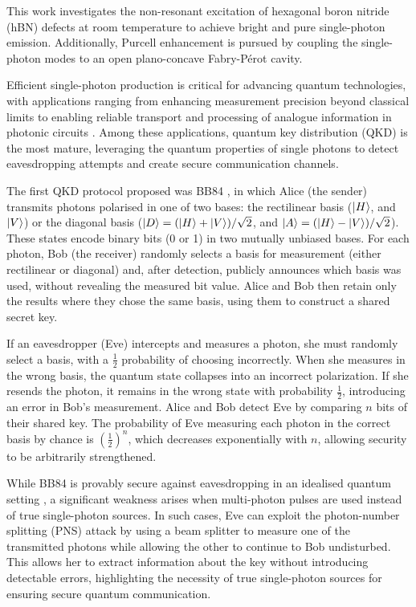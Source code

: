 This work investigates the non-resonant excitation of hexagonal boron nitride (hBN) defects at room temperature to achieve bright and pure single-photon emission. Additionally, Purcell enhancement is pursued by coupling the single-photon modes to an open plano-concave Fabry-Pérot cavity.

Efficient single-photon production is critical for advancing quantum technologies, with applications ranging from enhancing measurement precision beyond classical limits \cite{Nagata2007, Vitelli2010} to enabling reliable transport and processing of analogue information in photonic circuits \cite{Bogaerts2020}. Among these applications, quantum key distribution (QKD) is the most mature, leveraging the quantum properties of single photons to detect eavesdropping attempts and create secure communication channels. 

The first QKD protocol proposed was BB84 \cite{Bennett2014}, in which Alice (the sender) transmits photons polarised in one of two bases: the rectilinear basis ($\ket{H}$, and $\ket{V}$) or the diagonal basis ($\ket{D}=(\ket{H}+\ket{V})/\sqrt{2}$, and $\ket{A}=(\ket{H}-\ket{V})/\sqrt{2}$). These states encode binary bits (0 or 1) in two mutually unbiased bases. For each photon, Bob (the receiver) randomly selects a basis for measurement (either rectilinear or diagonal) and, after detection, publicly announces which basis was used, without revealing the measured bit value. Alice and Bob then retain only the results where they chose the same basis, using them to construct a shared secret key.

If an eavesdropper (Eve) intercepts and measures a photon, she must randomly select a basis, with a $ \frac{1}{2} $ probability of choosing incorrectly. When she measures in the wrong basis, the quantum state collapses into an incorrect polarization. If she resends the photon, it remains in the wrong state with probability $ \frac{1}{2} $, introducing an error in Bob’s measurement. Alice and Bob detect Eve by comparing $ n $ bits of their shared key. The probability of Eve measuring each photon in the correct basis by chance is $\left(\frac{1}{2}\right)^n$, which decreases exponentially with $n$, allowing security to be arbitrarily strengthened.

While BB84 is provably secure against eavesdropping in an idealised quantum setting \cite{Shor2000}, a significant weakness arises when multi-photon pulses are used instead of true single-photon sources. In such cases, Eve can exploit the photon-number splitting (PNS) attack \cite{Ashkenazy2024} by using a beam splitter to measure one of the transmitted photons while allowing the other to continue to Bob undisturbed. This allows her to extract information about the key without introducing detectable errors, highlighting the necessity of true single-photon sources for ensuring secure quantum communication.

